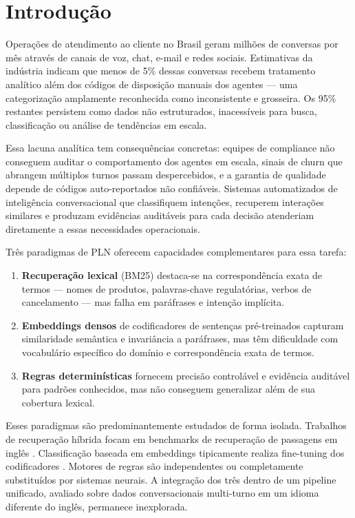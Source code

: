 \documentclass[11pt]{article}
\begin{document}
\section{Introdução}
\label{sec:intro}

Operações de atendimento ao cliente no Brasil geram milhões de conversas por mês através de canais de voz, chat, e-mail e redes sociais. Estimativas da indústria indicam que menos de 5\% dessas conversas recebem tratamento analítico além dos códigos de disposição manuais dos agentes --- uma categorização amplamente reconhecida como inconsistente e grosseira. Os 95\% restantes persistem como dados não estruturados, inacessíveis para busca, classificação ou análise de tendências em escala.

Essa lacuna analítica tem consequências concretas: equipes de compliance não conseguem auditar o comportamento dos agentes em escala, sinais de churn que abrangem múltiplos turnos passam despercebidos, e a garantia de qualidade depende de códigos auto-reportados não confiáveis. Sistemas automatizados de inteligência conversacional que classifiquem intenções, recuperem interações similares e produzam evidências auditáveis para cada decisão atenderiam diretamente a essas necessidades operacionais.

Três paradigmas de PLN oferecem capacidades complementares para essa tarefa:

\begin{enumerate}[leftmargin=*,itemsep=2pt]
    \item \textbf{Recuperação lexical} (BM25) destaca-se na correspondência exata de termos --- nomes de produtos, palavras-chave regulatórias, verbos de cancelamento --- mas falha em paráfrases e intenção implícita.
    \item \textbf{Embeddings densos} de codificadores de sentenças pré-treinados capturam similaridade semântica e invariância a paráfrases, mas têm dificuldade com vocabulário específico do domínio e correspondência exata de termos.
    \item \textbf{Regras determinísticas} fornecem precisão controlável e evidência auditável para padrões conhecidos, mas não conseguem generalizar além de sua cobertura lexical.
\end{enumerate}

Esses paradigmas são predominantemente estudados de forma isolada. Trabalhos de recuperação híbrida focam em benchmarks de recuperação de passagens em inglês \citep{formal2021splade,khattab2020colbert,karpukhin2020dense}. Classificação baseada em embeddings tipicamente realiza fine-tuning dos codificadores \citep{tunstall2022setfit,reimers2019sentencebert}. Motores de regras são independentes ou completamente substituídos por sistemas neurais. A integração dos três dentro de um pipeline unificado, avaliado sobre dados conversacionais multi-turno em um idioma diferente do inglês, permanece inexplorada.
\end{document}
